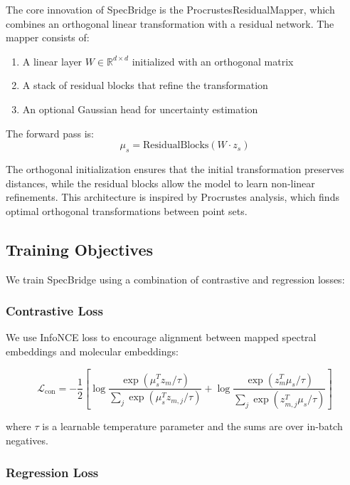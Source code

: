 \documentclass[11pt]{article}
\begin{document}
The core innovation of SpecBridge is the ProcrustesResidualMapper, which combines an orthogonal linear transformation with a residual network. The mapper consists of:

\begin{enumerate}
    \item A linear layer $W \in \mathbb{R}^{d \times d}$ initialized with an orthogonal matrix
    \item A stack of residual blocks that refine the transformation
    \item An optional Gaussian head for uncertainty estimation
\end{enumerate}

The forward pass is:
\begin{equation}
\mu_s = \text{ResidualBlocks}(W \cdot z_s)
\end{equation}

The orthogonal initialization ensures that the initial transformation preserves distances, while the residual blocks allow the model to learn non-linear refinements. This architecture is inspired by Procrustes analysis, which finds optimal orthogonal transformations between point sets.

\subsection{Training Objectives}

We train SpecBridge using a combination of contrastive and regression losses:

\subsubsection{Contrastive Loss}

We use InfoNCE loss to encourage alignment between mapped spectral embeddings and molecular embeddings:

\begin{equation}
\mathcal{L}_{\text{con}} = -\frac{1}{2}\left[\log\frac{\exp(\mu_s^T z_m / \tau)}{\sum_{j}\exp(\mu_s^T z_{m,j} / \tau)} + \log\frac{\exp(z_m^T \mu_s / \tau)}{\sum_{j}\exp(z_{m,j}^T \mu_s / \tau)}\right]
\end{equation}

where $\tau$ is a learnable temperature parameter and the sums are over in-batch negatives.

\subsubsection{Regression Loss}
\end{document}
